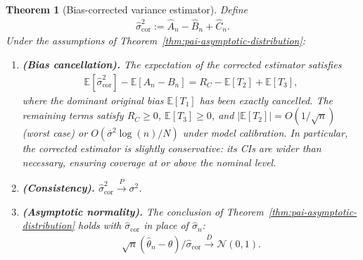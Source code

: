 \documentclass[11pt]{article}
\newtheorem{theorem}{Theorem}
\newcommand{\thetahat}{\hat{\theta}}
\newcommand{\sigmahat}{\hat{\sigma}}
\newcommand{\Bhat}{\hat{B}}
\newcommand{\Ahat}{\hat{A}}
\newcommand{\Chat}{\hat{C}}
\newcommand{\toP}{\xrightarrow{P}}
\newcommand{\toD}{\xrightarrow{D}}
\begin{document}
\begin{theorem}[Bias-corrected variance estimator]
\label{thm:corrected-variance}
    Define
    \begin{align}
    \label{eq:corrected-estimator}
        \sigmahat_{\mathrm{cor}}^2 := \Ahat_n - \Bhat_n + \Chat_n.
    \end{align}
    Under the assumptions of Theorem~\ref{thm:pai-asymptotic-distribution}:
    \begin{enumerate}\renewcommand{\theenumi}{\alph{enumi}}\renewcommand{\labelenumi}{(\theenumi)}
        \item \textbf{(Bias cancellation).} The expectation of the corrected estimator satisfies
        \begin{align}
        \label{eq:corrected-bias}
            \mathbb{E}[\sigmahat_{\mathrm{cor}}^2] - \mathbb{E}[A_n - B_n] = R_C - \mathbb{E}[T_2] + \mathbb{E}[T_3],
        \end{align}
        where the dominant original bias $\mathbb{E}[T_1]$ has been exactly cancelled. The remaining terms satisfy $R_C \geq 0$, $\mathbb{E}[T_3] \geq 0$, and $|\mathbb{E}[T_2]| = O(1/\sqrt{n})$ (worst case) or $O(\bar{\sigma}^2\log(n)/N)$ under model calibration. In particular, the corrected estimator is slightly conservative: its CIs are wider than necessary, ensuring coverage at or above the nominal level.

        \item \textbf{(Consistency).} $\sigmahat_{\mathrm{cor}}^2 \toP \sigma^2$.

        \item \textbf{(Asymptotic normality).} The conclusion of Theorem~\ref{thm:pai-asymptotic-distribution} holds with $\sigmahat_{\mathrm{cor}}$ in place of $\sigmahat_n$:
        \begin{align}
        \label{eq:corrected-clt}
            \sqrt{n}\left(\thetahat_n - \theta\right)/\sigmahat_{\mathrm{cor}} \toD \mathcal{N}(0,1).
        \end{align}
    \end{enumerate}
\end{theorem}
\end{document}

